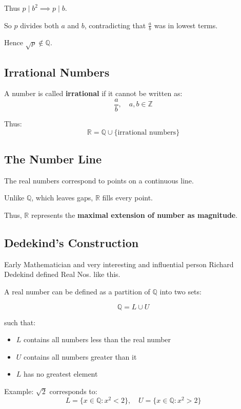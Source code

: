 \documentclass[11pt]{article}
\newcommand{\Z}{\mathbb{Z}}
\newcommand{\Q}{\mathbb{Q}}
\newcommand{\R}{\mathbb{R}}
\begin{document}
Thus $p \mid b^2 \implies p \mid b$.

So $p$ divides both $a$ and $b$, contradicting that $\frac{a}{b}$ was in lowest terms.

Hence $\sqrt{p} \notin \Q$.

\subsection*{Irrational Numbers}

A number is called \textbf{irrational} if it cannot be written as:
\[
\frac{a}{b}, \quad a,b \in \Z
\]

Thus:
\[
\R = \Q \cup \{\text{irrational numbers}\}
\]

\subsection*{The Number Line}

The real numbers correspond to points on a continuous line.

Unlike $\Q$, which leaves gaps, $\R$ fills every point.

Thus, $\R$ represents the \textbf{maximal extension of number as magnitude}.

\subsection*{Dedekind's Construction}

Early Mathematician and very interesting and influential person Richard Dedekind defined Real Nos. like this.

A real number can be defined as a partition of $\Q$ into two sets:

\[
\Q = L \cup U
\]

such that:

\begin{itemize}
    \item $L$ contains all numbers less than the real number
    \item $U$ contains all numbers greater than it
    \item $L$ has no greatest element
\end{itemize}

Example: $\sqrt{2}$ corresponds to:
\[
L = \{x \in \Q : x^2 < 2\}, \quad U = \{x \in \Q : x^2 > 2\}
\]
\end{document}

